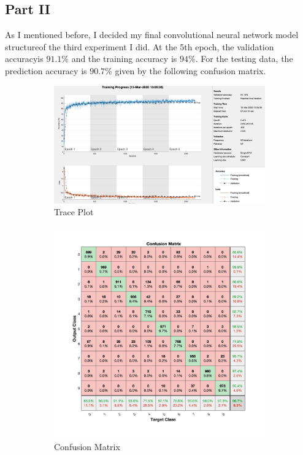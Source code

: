 \documentclass[12pt,letterpaper]{article}
\begin{document}
\subsection*{Part II}
As I mentioned before, I decided my final convolutional neural network model structureof the third experiment I did. At the 5th epoch, the validation accuracyis $91.1\%$ and the training accuracy is $94\%$. For the testing data, the prediction accuracy is $90.7\%$ given by the following confusion matrix. 

\begin{figure}[ht]
\begin{subfigure}{.5\textwidth}
  \centering
  \includegraphics[width=1\linewidth]{2-a.png}  
  \caption{Trace Plot}
  \label{fig:sub-first}
\end{subfigure}
\begin{subfigure}{.5\textwidth}
  \centering
  \includegraphics[width=1\linewidth]{2-b.jpg}  
  \caption{Confusion Matrix}
  \label{fig:sub-second}
\end{subfigure}
\label{fig:fig}
\caption{ }
\end{figure}
\end{document}
